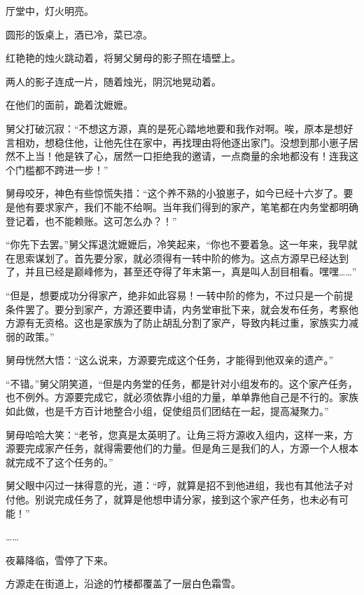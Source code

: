 
\begin{this_body}



厅堂中，灯火明亮。

圆形的饭桌上，酒已冷，菜已凉。

红艳艳的烛火跳动着，将舅父舅母的影子照在墙壁上。

两人的影子连成一片，随着烛光，阴沉地晃动着。

在他们的面前，跪着沈嬷嬷。

舅父打破沉寂：“不想这方源，真的是死心踏地地要和我作对啊。唉，原本是想好言相劝，想稳住他，让他先住在家中，再找理由将他逐出家门。没想到那小崽子居然不上当！他是铁了心，居然一口拒绝我的邀请，一点商量的余地都没有！连我这个门槛都不跨进一步！”

舅母咬牙，神色有些惊慌失措：“这个养不熟的小狼崽子，如今已经十六岁了。要是他有要求家产，我们不能不给啊。当年我们得到的家产，笔笔都在内务堂都明确登记着，也不能赖账。这可怎么办？！”

“你先下去罢。”舅父挥退沈嬷嬷后，冷笑起来，“你也不要着急。这一年来，我早就在思索谋划了。首先要分家，就必须得有一转中阶的修为。这点方源早已经达到了，并且已经是巅峰修为，甚至还夺得了年末第一，真是叫人刮目相看。嘿嘿……”

“但是，想要成功分得家产，绝非如此容易！一转中阶的修为，不过只是一个前提条件罢了。要分到家产，方源还要申请，内务堂审批下来，就会发布任务，考察他方源有无资格。这也是家族为了防止胡乱分割了家产，导致内耗过重，家族实力减弱的政策。”

舅母恍然大悟：“这么说来，方源要完成这个任务，才能得到他双亲的遗产。”

“不错。”舅父阴笑道，“但是内务堂的任务，都是针对小组发布的。这个家产任务，也不例外。方源要完成它，就必须依靠小组的力量，单单靠他自己是不行的。家族如此做，也是千方百计地整合小组，促使组员们团结在一起，提高凝聚力。”

舅母哈哈大笑：“老爷，您真是太英明了。让角三将方源收入组内，这样一来，方源要完成家产任务，就得需要他们的力量。但是角三是我们的人，方源一个人根本就完成不了这个任务的。”

舅父眼中闪过一抹得意的光，道：“哼，就算是招不到他进组，我也有其他法子对付他。别说完成任务了，就算是他想申请分家，接到这个家产任务，也未必有可能！”

……

夜幕降临，雪停了下来。

方源走在街道上，沿途的竹楼都覆盖了一层白色霜雪。


\end{this_body}
